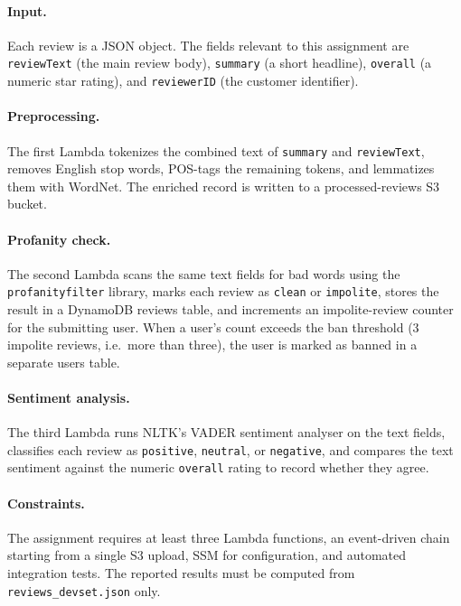 \documentclass[11pt,a4paper]{article}
\begin{document}
\paragraph{Input.}  Each review is a JSON object. The fields relevant to
this assignment are \texttt{reviewText} (the main review body),
\texttt{summary} (a short headline), \texttt{overall} (a numeric star
rating), and \texttt{reviewerID} (the customer identifier).

\paragraph{Preprocessing.}  The first Lambda tokenizes the combined text
of \texttt{summary} and \texttt{reviewText}, removes English stop words,
POS-tags the remaining tokens, and lemmatizes them with WordNet. The
enriched record is written to a processed-reviews S3 bucket.

\paragraph{Profanity check.}  The second Lambda scans the same text
fields for bad words using the \texttt{profanityfilter} library, marks
each review as \texttt{clean} or \texttt{impolite}, stores the result
in a DynamoDB reviews table, and increments an impolite-review counter
for the submitting user. When a user's count exceeds the ban threshold
(3 impolite reviews, i.e.\ more than three), the user is marked as
banned in a separate users table.

\paragraph{Sentiment analysis.}  The third Lambda runs NLTK's VADER
sentiment analyser on the text fields, classifies each review as
\texttt{positive}, \texttt{neutral}, or \texttt{negative}, and compares
the text sentiment against the numeric \texttt{overall} rating to record
whether they agree.

\paragraph{Constraints.}  The assignment requires at least three Lambda
functions, an event-driven chain starting from a single S3 upload, SSM
for configuration, and automated integration tests. The reported results
must be computed from \texttt{reviews\_devset.json} only.

\end{document}
